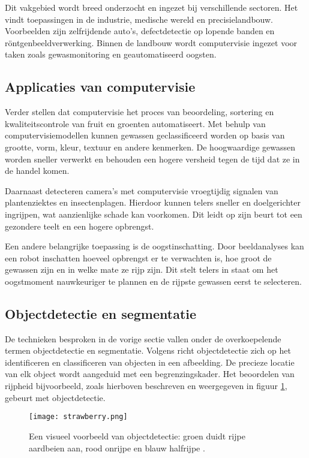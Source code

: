 Dit vakgebied wordt breed onderzocht en ingezet bij verschillende sectoren. Het vindt toepassingen in de industrie, medische wereld en precisielandbouw. Voorbeelden zijn zelfrijdende auto’s, defectdetectie op lopende banden en röntgenbeeldverwerking. Binnen de landbouw wordt computervisie ingezet voor taken zoals gewasmonitoring en geautomatiseerd oogsten.

\subsection{Applicaties van computervisie}
Verder stellen \textcite{Radojcic2023} dat computervisie het proces van beoordeling, sortering en kwaliteitscontrole van fruit en groenten automatiseert. Met behulp van computervisiemodellen kunnen gewassen geclassificeerd worden op basis van grootte, vorm, kleur, textuur en andere kenmerken. De hoogwaardige gewassen worden sneller verwerkt en behouden een hogere versheid tegen de tijd dat ze in de handel komen.

Daarnaast detecteren camera’s met computervisie vroegtijdig signalen van plantenziektes en insectenplagen. Hierdoor kunnen telers sneller en doelgerichter ingrijpen, wat aanzienlijke schade kan voorkomen. Dit leidt op zijn beurt tot een gezondere teelt en een hogere opbrengst.

Een andere belangrijke toepassing is de oogstinschatting. Door beeldanalyses kan een robot inschatten hoeveel opbrengst er te verwachten is, hoe groot de gewassen zijn en in welke mate ze rijp zijn. Dit stelt telers in staat om het oogstmoment nauwkeuriger te plannen en de rijpste gewassen eerst te selecteren.

\subsection{Objectdetectie en segmentatie}
De technieken besproken in de vorige sectie vallen onder de overkoepelende termen objectdetectie en segmentatie. Volgens \textcite{Sharma2020} richt objectdetectie zich op het identificeren en classificeren van objecten in een afbeelding. De precieze locatie van elk object wordt aangeduid met een begrenzingskader. Het beoordelen van rijpheid bijvoorbeeld, zoals hierboven beschreven en weergegeven in figuur \ref{fig:strawberry}, gebeurt met objectdetectie.

\begin{figure}
    \centering
    \texttt{[image: strawberry.png]}
    \caption[Voorbeeld objectdetectie.]{\label{fig:strawberry}Een visueel voorbeeld van objectdetectie: groen duidt rijpe aardbeien aan, rood onrijpe en blauw halfrijpe \autocite{Chai2023}.}
\end{figure}

